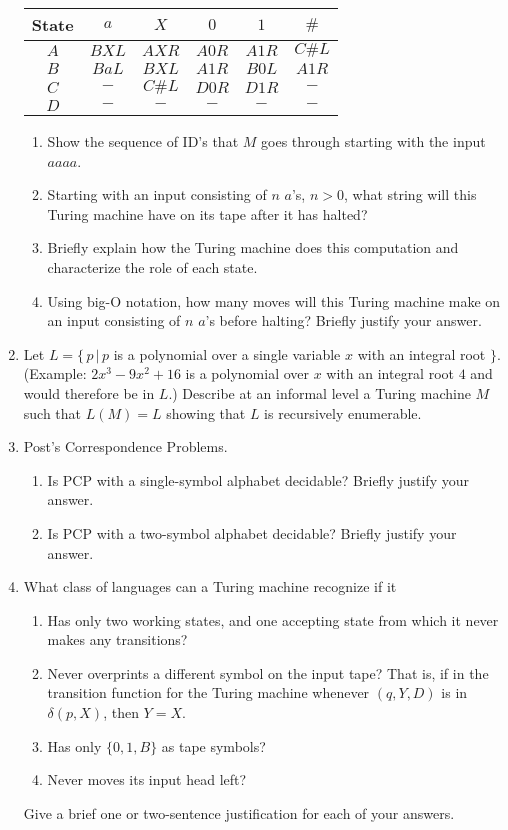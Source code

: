 \documentclass[]{article}
\begin{document}
\begin{enumerate}
\begin{tabular}{c|c|c|c|c|c }
State & $a$   & $X$    & $0$   & $1$   & $\#$   \\ \hline
$A$   & $BXL$ & $AXR$  & $A0R$ & $A1R$ & $C\#L$ \\
$B$   & $BaL$ & $BXL$  & $A1R$ & $B0L$ & $A1R$  \\
$C$   & $-$   & $C\#L$ & $D0R$ & $D1R$ & $-$    \\
$D$   & $-$   & $-$    & $-$   & $-$   & $-$
\end{tabular}
\begin{enumerate}
\item Show the sequence of ID's that $M$ goes through starting with the input
$aaaa$.
\item Starting with an input consisting of $n$ $a$'s, $n > 0$, what string will
this Turing machine have on its tape after it has halted?
\item Briefly explain how the Turing machine does this computation and
characterize the role of each state.
\item Using big-O notation, how many moves will this Turing machine make on an
input consisting of $n$ $a$'s before halting? Briefly justify your answer.
\end{enumerate}
\item Let $L = \{\,p\,|\,p$ is a polynomial over a single variable $x$ with an
integral root $\}$. (Example: $2x^3-9x^2+16$ is a polynomial over $x$ with an
integral root $4$ and would therefore be in $L$.) Describe at an informal level
a Turing machine $M$ such that $L(M) = L$ showing that $L$ is recursively
enumerable.
\item Post's Correspondence Problems.
\begin{enumerate}
\item Is PCP with a single-symbol alphabet decidable? Briefly justify your
answer.
\item Is PCP with a two-symbol alphabet decidable? Briefly justify your answer.
\end{enumerate}
\item What class of languages can a Turing machine recognize if it
\begin{enumerate}
\item Has only two working states, and one accepting state from which it never
makes any transitions?
\item Never overprints a different symbol on the input tape? That is, if in the
transition function for the Turing machine whenever $(q, Y, D)$ is in
$\delta(p,X)$, then $Y = X$.
\item Has only $\{0, 1, B\}$ as tape symbols?
\item Never moves its input head left?
\end{enumerate}
Give a brief one or two-sentence justification for each of your answers.
\end{enumerate}
\end{document}

